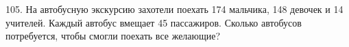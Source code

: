 105. На автобусную экскурсию захотели поехать 174 мальчика, 148 девочек и 14 учителей. Каждый автобус вмещает 45 пассажиров. Сколько автобусов потребуется, чтобы смогли поехать все желающие?\\
